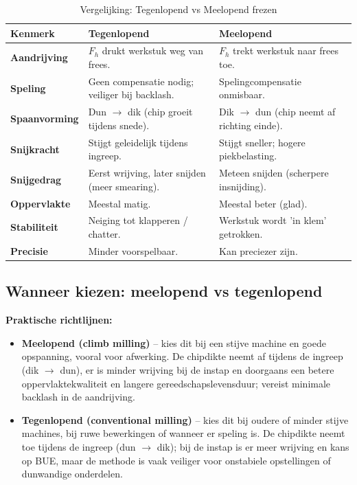\documentclass[a4paper,12pt,twoside]{report}
\begin{document}
\begin{table}[ht]
	\centering
	\caption{Vergelijking: Tegenlopend vs Meelopend frezen}
	\label{tab:meelopend_vs_tegenlopend}
	\begin{tabularx}{\textwidth}{|l|X|X|}
		\hline
		\textbf{Kenmerk}      & \textbf{Tegenlopend}                               & \textbf{Meelopend}                                    \\
		\hline
		\textbf{Aandrijving}  & $F_h$ drukt werkstuk weg van frees.                & $F_h$ trekt werkstuk naar frees toe.                  \\
		\hline
		\textbf{Speling}      & Geen compensatie nodig; veiliger bij backlash.     & Spelingcompensatie onmisbaar.                         \\
		\hline
		\textbf{Spaanvorming} & Dun $\rightarrow$ dik (chip groeit tijdens snede). & Dik $\rightarrow$ dun (chip neemt af richting einde). \\
		\hline
		\textbf{Snijkracht}   & Stijgt geleidelijk tijdens ingreep.                & Stijgt sneller; hogere piekbelasting.                 \\
		\hline
		\textbf{Snijgedrag}   & Eerst wrijving, later snijden (meer smearing).     & Meteen snijden (scherpere insnijding).                \\
		\hline
		\textbf{Oppervlakte}  & Meestal matig.                                     & Meestal beter (glad).                                 \\
		\hline
		\textbf{Stabiliteit}  & Neiging tot klapperen / chatter.                   & Werkstuk wordt 'in klem' getrokken.                   \\
		\hline
		\textbf{Precisie}     & Minder voorspelbaar.                               & Kan preciezer zijn.                                   \\
		\hline
	\end{tabularx}
\end{table}
\FloatBarrier

\subsection{Wanneer kiezen: meelopend vs tegenlopend}
\textbf{Praktische richtlijnen:}
\begin{itemize}
	\item \textbf{Meelopend (climb milling)} -- kies dit bij een stijve machine en goede opspanning, vooral voor afwerking. De chipdikte neemt af tijdens de ingreep (dik $\rightarrow$ dun), er is minder wrijving bij de instap en doorgaans een betere oppervlaktekwaliteit en langere gereedschapslevensduur; vereist minimale backlash in de aandrijving.
	\item \textbf{Tegenlopend (conventional milling)} -- kies dit bij oudere of minder stijve machines, bij ruwe bewerkingen of wanneer er speling is. De chipdikte neemt toe tijdens de ingreep (dun $\rightarrow$ dik); bij de instap is er meer wrijving en kans op BUE, maar de methode is vaak veiliger voor onstabiele opstellingen of dunwandige onderdelen.
\end{itemize}
\end{document}
